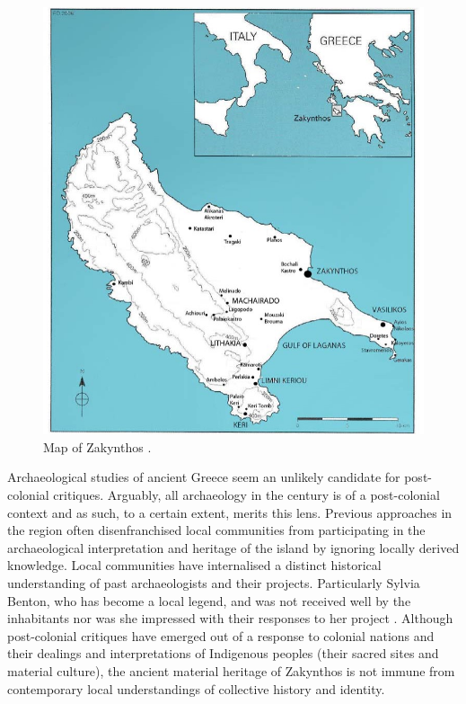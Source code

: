 		\begin{figure}[!bt]
			\includegraphics[width=\linewidth]{figures/takkou_dobroski_Fig1.jpg}
			\caption{Map of Zakynthos \parencite[128]{VanWijngaarden_2013}.}
			\label{fig:Takkou_Fig1}
		\end{figure}
		
	
Archaeological studies of ancient Greece seem an unlikely candidate for post-colonial critiques. Arguably, all archaeology in the  century is of a post-colonial context and as such, to a certain extent, merits this lens. Previous approaches in the region often disenfranchised local communities from participating in the archaeological interpretation and heritage of the island by ignoring locally derived knowledge. Local communities have internalised a distinct historical understanding of past archaeologists and their projects. Particularly Sylvia Benton, who has become a local legend, and was not received well by the inhabitants nor was she impressed with their responses to her project \parencite[213]{Benton_1933}. Although post-colonial critiques have emerged out of a response to colonial nations and their dealings and interpretations of Indigenous peoples (their sacred sites and material culture), the ancient material heritage of Zakynthos is not immune from contemporary local understandings of collective history and identity. 
	
